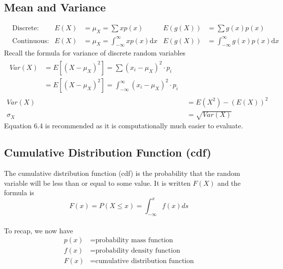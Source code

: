     \subsection{Mean and Variance}  %
        \begin{align}
            &\text{Discrete:}    & E(X)&=\mu_X=\sum xp(x) & E(g(X))&=\sum g(x)p(x)\\
            &\text{Continuous:}  & E(X)&=\mu_X=\int_{-\infty}^{\infty} xp(x)\text{d}x & E(g(X))&=\int_{-\infty}^{\infty}g(x)p(x)\text{d}x
        \end{align}
        Recall the formula for variance of discrete random variables
        \begin{align}
            \begin{split}
                Var(X)&=E[{(X-\mu_X)}^2]=\sum{(x_i-\mu_X)}^2\cdot p_i \\
                    &=E[{(X-\mu_X)}^2]=\int_{-\infty}^\infty{(x_i-\mu_X)}^2\cdot p_i
            \end{split}\\
            Var(X)&=E(X^2)-(E(X))^2 \\
            \sigma_X&=\sqrt{Var(X)}
        \end{align}
        Equation 6.4 is recommended as it is computationally much easier to evaluate.

    \subsection{Cumulative Distribution Function (cdf)}  %
        The cumulative distribution function (cdf) is the probability that the random variable will be less than or equal to some value. It is written $F(X)$ and the formula is
        \begin{equation}
            F(x)=P(X\leq x)=\int_{-\infty}^{x} f(x)ds
        \end{equation}
        \\
        To recap, we now have
        \begin{align}
            p(x)&= \text{probability mass function} \\
            f(x)&= \text{probability density function} \\
            F(x)&= \text{cumulative distribution function}
        \end{align}

